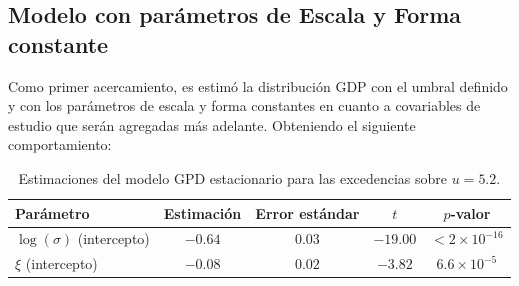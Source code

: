 \subsection{Modelo con parámetros de Escala y Forma constante}
Como primer acercamiento, es estimó la distribución GDP con el umbral definido y con los parámetros de escala y forma constantes en cuanto a covariables de estudio que serán agregadas más adelante.
Obteniendo el siguiente comportamiento:
\begin{table}[H]
    \centering
    \begin{tabular}{lcccc}
        \toprule
        Parámetro & Estimación & Error estándar & $t$ & $p$-valor \\
        \midrule
        $\log(\sigma)$ (intercepto) & $-0.64$ & $0.03$ & $-19.00$ & $< 2 \times 10^{-16}$ \\
        $\xi$ (intercepto)          & $-0.08$ & $0.02$ & $-3.82$  & $6.6 \times 10^{-5}$ \\
        \bottomrule
    \end{tabular}
    \caption{Estimaciones del modelo GPD estacionario para las excedencias sobre $u = 5.2$.}
    \label{tab:gpd_estacionario}
\end{table} 


